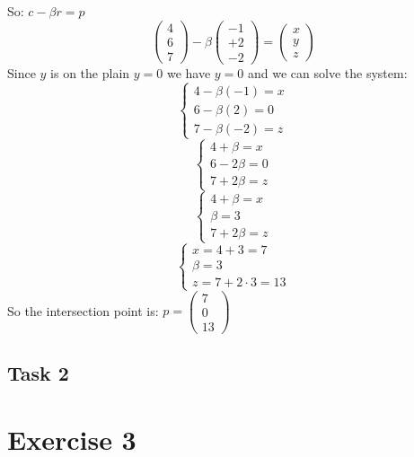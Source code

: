 \documentclass[tikz,14pt,fleqn]{article}
\begin{document}
So: $ c - \beta r = p $
\[
   \begin{pmatrix} 4 \\ 6 \\ 7 \end{pmatrix} - \beta \begin{pmatrix} -1 \\ +2 \\ -2 \end{pmatrix} = \begin{pmatrix} x \\ y \\ z \end{pmatrix}
\]
Since $y$ is on the plain $y = 0$ we have $y = 0$ and we can solve the system:
\[
   \begin{cases}
      4 - \beta (-1) = x \\
      6 - \beta (2) = 0 \\
      7 - \beta (-2) = z
   \end{cases}
\]
\[
   \begin{cases}
      4 + \beta = x \\
      6 - 2\beta = 0 \\
      7 + 2\beta = z
   \end{cases}
\]
\[
   \begin{cases}
      4 + \beta = x \\
      \beta = 3 \\
      7 + 2\beta = z
   \end{cases}
\]
\[
   \begin{cases}
      x = 4+3=7 \\
      \beta = 3 \\
      z = 7 + 2 \cdot 3 = 13
   \end{cases}
\]
So the intersection point is: $p = \begin{pmatrix} 7 \\ 0 \\ 13 \end{pmatrix}$


\subsection{Task 2}



\newpage
\section{Exercise 3}
\end{document}
